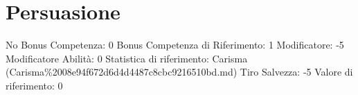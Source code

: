\section{Persuasione}\label{persuasione}

\begin{description}
\tightlist
\item[Tags: ABI]
No Bonus Competenza: 0 Bonus Competenza di Riferimento: 1 Modificatore:
-5 Modificatore Abilità: 0 Statistica di riferimento: Carisma
(Carisma\%2008e94f672d6d4d4487c8cbc9216510bd.md) Tiro Salvezza: -5
Valore di riferimento: 0
\end{description}

